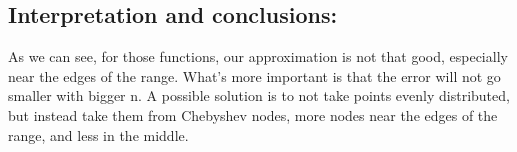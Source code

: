 \documentclass{article}
\begin{document}
\subsection*{Interpretation and conclusions:}
As we can see, for those functions, our approximation is not that good, especially near the edges of the range. What's more important is that the error will not go smaller with bigger n. A possible solution is to not take points evenly distributed, but instead take them from Chebyshev nodes, more nodes near the edges of the range, and less in the middle.
\end{document}
